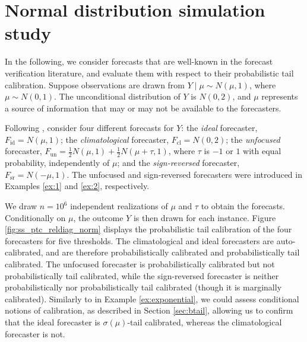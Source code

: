 \documentclass[12pt]{article}
\newcommand{\1}{\mathbf{1}} %
\theoremstyle{definition}
\begin{document}
\section{Normal distribution simulation study}\label{sec:normsim}

In the following, we consider forecasts that are well-known in the forecast verification literature, and evaluate them with respect to their probabilistic tail calibration. Suppose observations are drawn from $Y \mid \mu \sim N(\mu, 1)$, where $\mu \sim N(0, 1)$. The unconditional distribution of $Y$ is $N(0, 2)$, and $\mu$ represents a source of information that may or may not be available to the forecasters. 

Following \cite{GneitingEtAl2007}, consider four different forecasts for $Y$: the \textit{ideal} forecaster, $F_{\mathrm{id}} = N(\mu, 1)$; the \textit{climatological} forecaster, $F_{\mathrm{cl}} = N(0, 2)$; the \textit{unfocused} forecaster, $F_{\mathrm{un}} = \frac{1}{2} N (\mu, 1) + \frac{1}{2} N(\mu + \tau, 1)$, where $\tau$ is $-1$ or $1$ with equal probability, independently of $\mu$; and the \textit{sign-reversed} forecaster, $F_{\mathrm{sr}} = N (-\mu, 1)$. The unfocused and sign-reversed forecasters were introduced in Examples \ref{ex:1} and \ref{ex:2}, respectively.

We draw $n = 10^{6}$ independent realizations of $\mu$ and $\tau$ to obtain the forecasts. Conditionally on $\mu$, the outcome $Y$ is then drawn for each instance. Figure \ref{fig:ss_ptc_reldiag_norm} displays the probabilistic tail calibration of the four forecasters for five thresholds. The climatological and ideal forecasters are auto-calibrated, and are therefore probabilistically calibrated and probabilistically tail calibrated. The unfocused forecaster is probabilistically calibrated but not probabilistically tail calibrated, while the sign-reversed forecaster is neither probabilistically nor probabilistically tail calibrated (though it is marginally calibrated). Similarly to in Example \ref{ex:exponential}, we could assess conditional notions of calibration, as described in Section \ref{sec:btail}, allowing us to confirm that the ideal forecaster is $\sigma(\mu)$-tail calibrated, whereas the climatological forecaster is not. 
\end{document}
